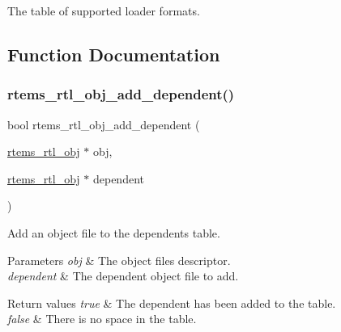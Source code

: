 The table of supported loader formats. 

\subsection{Function Documentation}
\mbox{\label{rtl-obj_8c_a4c2f2836262a4606efecf94f95ac0cd8}} 
\subsubsection{\texorpdfstring{rtems\_rtl\_obj\_add\_dependent()}{rtems\_rtl\_obj\_add\_dependent()}}
{\footnotesize\ttfamily bool rtems\+\_\+rtl\+\_\+obj\+\_\+add\+\_\+dependent (\begin{DoxyParamCaption}\item[{\mbox{\hyperlink{structrtems__rtl__obj}{rtems\+\_\+rtl\+\_\+obj}} $\ast$}]{obj,  }\item[{\mbox{\hyperlink{structrtems__rtl__obj}{rtems\+\_\+rtl\+\_\+obj}} $\ast$}]{dependent }\end{DoxyParamCaption})}

Add an object file to the dependents table.


\begin{DoxyParams}{Parameters}
{\em obj} & The object file\textquotesingle{}s descriptor. \\
\hline
{\em dependent} & The dependent object file to add. \\
\hline
\end{DoxyParams}

\begin{DoxyRetVals}{Return values}
{\em true} & The dependent has been added to the table. \\
\hline
{\em false} & There is no space in the table. \\
\hline
\end{DoxyRetVals}
\mbox{\label{rtl-obj_8c_a08fe8380ba12aee966bd18675becf6cd}} 
